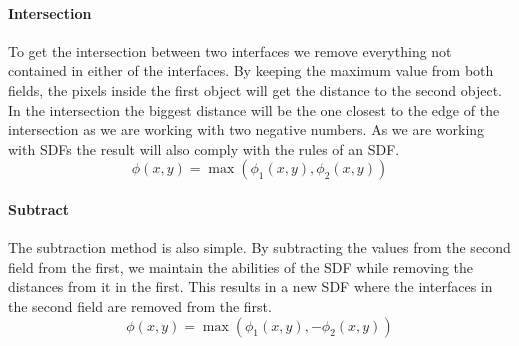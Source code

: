 \paragraph{Intersection}
To get the intersection between two interfaces we remove everything
not contained in either of the interfaces. By keeping the maximum
value from both fields, the pixels inside the first object will get
the distance to the second object. In the intersection the biggest
distance will be the one closest to the edge of the intersection as we
are working with two negative numbers. As we are working with SDFs the
result will also comply with the rules of an SDF.
\begin{equation}
\phi(x,y) = \max(\phi_1(x,y),\phi_2(x,y))
\end{equation}

\paragraph{Subtract}
The subtraction method is also simple. By subtracting the values from
the second field from the first, we maintain the abilities of the SDF
while removing the distances from it in the first. This results in a
new SDF where the interfaces in the second field are removed from the
first.
\begin{equation}
\phi(x,y) = \max(\phi_1(x,y),-\phi_2(x,y))
\end{equation}

